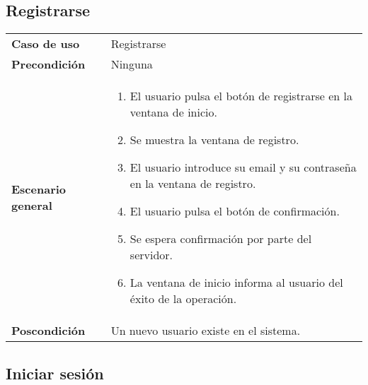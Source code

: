 

\subsection{Registrarse}

{\footnotesize
\begin{tabularx}{0.95\textwidth}{p{}|X}

\textbf{Caso de uso} & Registrarse \\

\textbf{Precondición} & Ninguna \\

\textbf{Escenario general} & \begin{enumerate}
\item El usuario pulsa el botón de registrarse en la ventana de inicio.
\item Se muestra la ventana de registro.
\item El usuario introduce su email y su contraseña en la ventana de registro.
\item El usuario pulsa el botón de confirmación.
\item Se espera confirmación por parte del servidor.
\item La ventana de inicio informa al usuario del éxito de la operación.
\end{enumerate} \\

\textbf{Poscondición} & Un nuevo usuario existe en el sistema.

\end{tabularx}
}

\subsection{Iniciar sesión}

